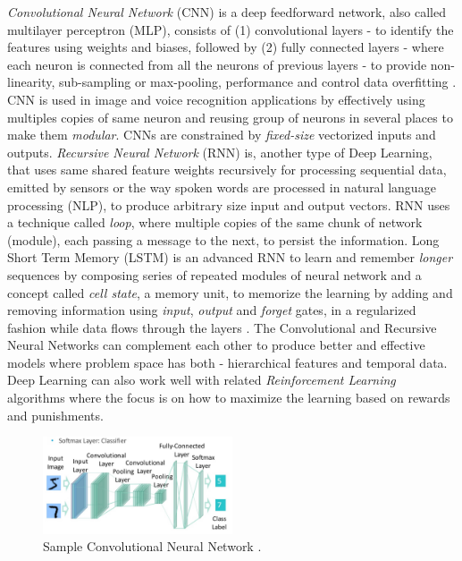 \documentclass[sigconf]{acmart}
\begin{document}
	{\em Convolutional Neural Network} (CNN) is a deep feedforward network, also called multilayer perceptron (MLP), consists of (1) convolutional layers - to identify the features using weights and biases, followed by (2) fully connected layers - where each neuron is connected from all the neurons of previous layers - to provide non-linearity, sub-sampling or max-pooling, performance and control data overfitting \cite{ChristopherOlah2014}. CNN is used in image and voice recognition applications by effectively using multiples copies of same neuron and reusing group of neurons in several places to make them {\em modular}. CNNs are constrained by {\em fixed-size} vectorized inputs and outputs. {\em Recursive Neural Network} (RNN) is, another type of Deep Learning, that uses same shared feature weights recursively for processing sequential data, emitted by sensors or the way spoken words are processed in natural language processing (NLP), to produce arbitrary size input and output vectors. RNN uses a technique called {\em loop}, where multiple copies of the same chunk of network (module), each passing a message to the next, to persist the information. Long Short Term Memory (LSTM) is an advanced RNN to learn and remember {\em longer} sequences by composing series of repeated modules of neural network and a concept called {\em cell state}, a memory unit, to memorize the learning by adding and removing information using {\em input}, {\em output} and {\em forget} gates, in a regularized fashion while data flows through the layers \cite{Olah2015}. The Convolutional and Recursive Neural Networks can complement each other to produce better and effective models where problem space has both - hierarchical features and temporal data. Deep Learning can also work well with related {\em Reinforcement Learning} algorithms where the focus is on how to maximize the learning based on rewards and punishments.	

	\begin{figure}
		\centering
		\includegraphics[width=0.5\textwidth]{images/cnn}
		\caption{Sample Convolutional Neural Network \cite{Chang2016}.} \label{fig:figure3} 
	\end{figure}
\end{document}
